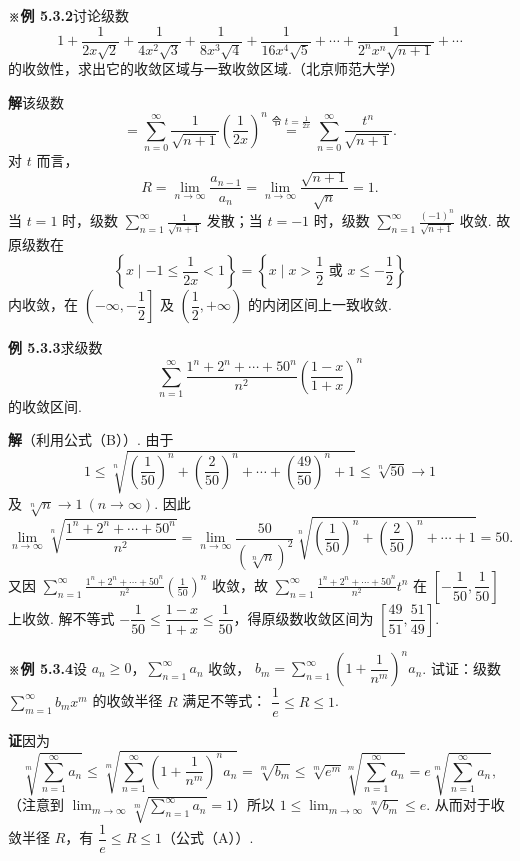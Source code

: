\documentclass[UTF8,12pt,a4paper,fontset=fandol]{ctexart}
\begin{document}
\noindent\textbf{※例 5.3.2}\quad 讨论级数
\[
  1+\frac1{2x\sqrt2}+\frac1{4x^2\sqrt3}+\frac1{8x^3\sqrt4}
  +\frac1{16x^4\sqrt5}+\cdots+\frac1{2^nx^n\sqrt{n+1}}+\cdots
\]
的收敛性，求出它的收敛区域与一致收敛区域.（北京师范大学）

\noindent\textbf{解}\quad 该级数
\[
  =\sum_{n=0}^{\infty}\frac1{\sqrt{n+1}}\left(\frac1{2x}\right)^n
  \overset{\text{令 }t=\frac1{2x}}{=}
  \sum_{n=0}^{\infty}\frac{t^n}{\sqrt{n+1}}.
\]
对 $t$ 而言，
\[
  R=\lim_{n\to\infty}\frac{a_{n-1}}{a_n}
  =\lim_{n\to\infty}\frac{\sqrt{n+1}}{\sqrt n}=1.
\]
当 $t=1$ 时，级数 $\displaystyle\sum_{n=1}^{\infty}\frac1{\sqrt{n+1}}$ 发散；当 $t=-1$ 时，级数
$\displaystyle\sum_{n=1}^{\infty}\frac{(-1)^n}{\sqrt{n+1}}$ 收敛. 故原级数在
\[
  \left\{x\mid -1\le\frac1{2x}<1\right\}
  =\left\{x\mid x>\frac12\text{ 或 }x\le-\frac12\right\}
\]
内收敛，在 $\left(-\infty,-\dfrac12\right]$ 及 $\left(\dfrac12,+\infty\right)$ 的内闭区间上一致收敛.

\noindent\textbf{例 5.3.3}\quad 求级数
\[
  \sum_{n=1}^{\infty}\frac{1^n+2^n+\cdots+50^n}{n^2}
  \left(\frac{1-x}{1+x}\right)^n
\]
的收敛区间.

\noindent\textbf{解}\quad （利用公式（B））. 由于
\[
  1\le\sqrt[n]{\left(\frac1{50}\right)^n+\left(\frac2{50}\right)^n+\cdots+
  \left(\frac{49}{50}\right)^n+1}\le\sqrt[n]{50}\to1
\]
及 $\sqrt[n]{n}\to1\ (n\to\infty)$. 因此
\[
  \lim_{n\to\infty}\sqrt[n]{\frac{1^n+2^n+\cdots+50^n}{n^2}}
  =\lim_{n\to\infty}\frac{50}{(\sqrt[n]{n})^2}
  \sqrt[n]{\left(\frac1{50}\right)^n+\left(\frac2{50}\right)^n+\cdots+1}=50.
\]
又因 $\displaystyle\sum_{n=1}^{\infty}\frac{1^n+2^n+\cdots+50^n}{n^2}\left(\frac1{50}\right)^n$ 收敛，故
$\displaystyle\sum_{n=1}^{\infty}\frac{1^n+2^n+\cdots+50^n}{n^2}t^n$ 在
$\left[-\dfrac1{50},\dfrac1{50}\right]$ 上收敛. 解不等式
$-\dfrac1{50}\le\dfrac{1-x}{1+x}\le\dfrac1{50}$，得原级数收敛区间为
$\left[\dfrac{49}{51},\dfrac{51}{49}\right]$.

\noindent\textbf{※例 5.3.4}\quad 设 $a_n\ge0$，$\displaystyle\sum_{n=1}^{\infty}a_n$ 收敛，
$b_m=\displaystyle\sum_{n=1}^{\infty}\left(1+\dfrac1{n^m}\right)^n a_n$. 试证：级数
$\displaystyle\sum_{m=1}^{\infty}b_mx^m$ 的收敛半径 $R$ 满足不等式：
$\dfrac1e\le R\le1$.

\noindent\textbf{证}\quad 因为
\[
  \sqrt[m]{\sum_{n=1}^{\infty}a_n}
  \le\sqrt[m]{\sum_{n=1}^{\infty}\left(1+\frac1{n^m}\right)^n a_n}
  =\sqrt[m]{b_m}
  \le\sqrt[m]{e^m}\sqrt[m]{\sum_{n=1}^{\infty}a_n}
  =e\sqrt[m]{\sum_{n=1}^{\infty}a_n},
\]
（注意到 $\displaystyle\lim_{m\to\infty}\sqrt[m]{\sum_{n=1}^{\infty}a_n}=1$）所以
$1\le\displaystyle\lim_{m\to\infty}\sqrt[m]{b_m}\le e$. 从而对于收敛半径 $R$，有
$\dfrac1e\le R\le1$（公式（A））.
\end{document}
